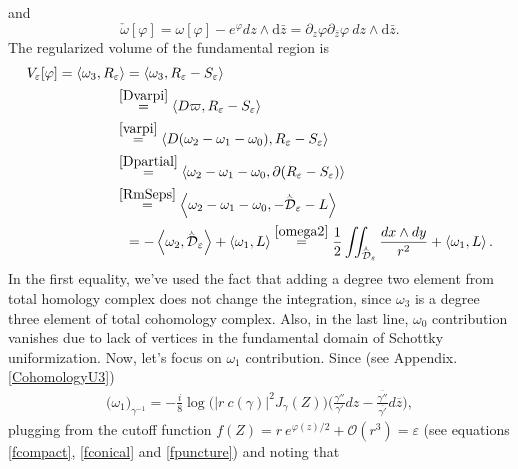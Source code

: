 \documentclass[a4paper,11pt]{article}
\newcommand{\dd}{\mathrm{d}}
\newcommand{\singfund}{\overset{{}_{\curlywedge}}{\mathcal{D}}}
\newcommand{\stks}[1]{
	 \left< #1 \right>
}
\begin{document}
and 
\begin{equation}
\check{\omega}[\varphi] = \omega[\varphi]-e^{\varphi} dz\wedge \dd\bar{z} = \partial_{z}\varphi \partial_{\bar{z}}\varphi~dz\wedge \dd\bar{z}.\label{omegacheck} 
\end{equation}
The regularized volume of the fundamental region is
\begin{equation}
\begin{aligned}
V_\varepsilon[\varphi] = \stks{\omega_3,R_\varepsilon} &= \stks{\omega_3 , R_\varepsilon-S_\varepsilon}\\& \hspace{-2.5mm}
\overset{\eqref{Dvarpi}}{=}\stks{D\varpi,R_{\varepsilon}-S_{\varepsilon}}\\& \hspace{-2.5mm}\overset{\eqref{varpi}}{=} \stks{D(\omega_2 -\omega_1-\omega_0) ,R_\varepsilon-S_\varepsilon } \\ &\hspace{-2.5mm}\overset{\eqref{Dpartial}}{=}
\stks{\omega_2 -\omega_1-\omega_0, \partial(R_\varepsilon-S_\varepsilon)}\\& \hspace{-2.5mm}\overset{\eqref{RmSeps}}{=} \stks{\omega_2 -\omega_1-\omega_0, -\singfund_{\varepsilon}-L} \\ &=
-\stks{\omega_2,\singfund_{\varepsilon}} + \stks{\omega_1,L}  %
\overset{\eqref{omega2}}{=} 
\frac12 \iint_{\singfund_{\varepsilon}}  \frac{dx\wedge dy}{r^2} + \stks{\omega_1,L}.
\end{aligned}\label{V1}
\end{equation}
In the first equality, we've used the fact that adding a degree two element from total homology complex does not change the integration, since $\omega_3$ is a degree three element of total cohomology complex.
Also, in the last line, $\omega_0$ contribution vanishes due to lack of vertices in the fundamental domain of Schottky uniformization. Now, let's focus on $\omega_1$ contribution. Since (see Appendix.\ref{CohomologyU3})
\begin{equation}
\begin{aligned}
\big(\omega_1\big)_{\gamma^{-1}} = -\frac{i}{8} \log \Big(
|r~c(\gamma)|^2 J_\gamma(Z)
\Big) \Big(
\frac{\gamma''}{\gamma'}dz -  \frac{\overline{\gamma''}}{\overline{\gamma'}}d\overline{z}
\Big),
\end{aligned}
\end{equation}
plugging from the cutoff function $f(Z) =  r~e^{\varphi(z)/2} + \mathcal{O}(r^3)=\varepsilon $ (see equations \eqref{fcompact}, \eqref{fconical} and \eqref{fpuncture}) and noting that 
\end{document}
